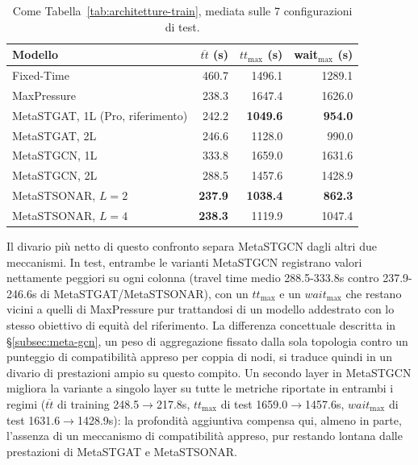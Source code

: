 \begin{table}[htbp]
  \centering
  \begin{tabular}{@{}lrrr@{}}
    \toprule
    Modello                          & $\overline{tt}$ (s) & $tt_{\max}$ (s) & wait$_{\max}$ (s) \\
    \midrule
    Fixed-Time                       & 460.7               & 1496.1          & 1289.1            \\
    MaxPressure                      & 238.3               & 1647.4          & 1626.0            \\
    MetaSTGAT, 1L (Pro, riferimento) & 242.2               & \textbf{1049.6} & \textbf{954.0}    \\
    MetaSTGAT, 2L                    & 246.6               & 1128.0          & 990.0             \\
    MetaSTGCN, 1L                    & 333.8               & 1659.0          & 1631.6            \\
    MetaSTGCN, 2L                    & 288.5               & 1457.6          & 1428.9            \\
    MetaSTSONAR, $L{=}2$             & \textbf{237.9}      & \textbf{1038.4} & \textbf{862.3}    \\
    MetaSTSONAR, $L{=}4$             & \textbf{238.3}      & 1119.9          & 1047.4            \\
    \bottomrule
  \end{tabular}
  \caption{Come Tabella~\ref{tab:architetture-train}, mediata sulle 7
    configurazioni di test.}
  \label{tab:architetture-test}
\end{table}

Il divario più netto di questo confronto separa MetaSTGCN dagli altri due
meccanismi. In test, entrambe le varianti
MetaSTGCN registrano valori nettamente peggiori su ogni colonna (travel time medio
288.5-333.8s contro 237.9-246.6s di MetaSTGAT/MetaSTSONAR), con un
$tt_{\max}$ e un $wait_{\max}$ che restano vicini a quelli di MaxPressure pur
trattandosi di un modello addestrato con lo stesso obiettivo di equità del
riferimento. La differenza concettuale descritta in §\ref{subsec:meta-gcn},
un peso di aggregazione fissato dalla sola topologia contro un punteggio di
compatibilità appreso per coppia di nodi, si traduce quindi in un divario di
prestazioni ampio su questo compito.
Un secondo layer in MetaSTGCN
migliora la variante a singolo layer su tutte le metriche riportate in
entrambi i regimi ($\overline{tt}$ di training 248.5$\to$217.8s,
$tt_{\max}$ di test 1659.0$\to$1457.6s, $wait_{\max}$ di test
1631.6$\to$1428.9s): la profondità aggiuntiva compensa qui, almeno in
parte, l'assenza di un meccanismo di compatibilità appreso, pur restando
lontana dalle prestazioni di MetaSTGAT e MetaSTSONAR.

